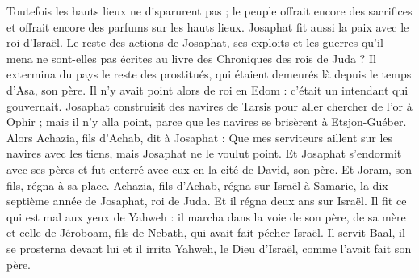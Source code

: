 \begin{multicols}{2}
Toutefois les hauts lieux ne disparurent pas ; le peuple offrait encore des sacrifices et offrait encore des parfums sur les hauts lieux.
Josaphat fit aussi la paix avec le roi d'Israël.
Le reste des actions de Josaphat, ses exploits et les guerres qu'il mena ne sont-elles pas écrites au livre des Chroniques des rois de Juda ?
Il extermina du pays le reste des prostitués, qui étaient demeurés là depuis le temps d'Asa, son père.
Il n'y avait point alors de roi en Edom : c’était un intendant qui gouvernait.
Josaphat construisit des navires de Tarsis pour aller chercher de l'or à Ophir ; mais il n'y alla point, parce que les navires se brisèrent à Etsjon-Guéber.
Alors Achazia, fils d'Achab, dit à Josaphat : Que mes serviteurs aillent sur les navires avec les tiens, mais Josaphat ne le voulut point.
Et Josaphat s’endormit avec ses pères et fut enterré avec eux en la cité de David, son père. Et Joram, son fils, régna à sa place.
Achazia, fils d'Achab, régna sur Israël à Samarie, la dix-septième année de Josaphat, roi de Juda. Et il régna deux ans sur Israël.
Il fit ce qui est mal aux yeux de Yahweh : il marcha dans la voie de son père, de sa mère et celle de Jéroboam, fils de Nebath, qui avait fait pécher Israël.
Il servit Baal, il se prosterna devant lui et il irrita Yahweh, le Dieu d'Israël, comme l’avait fait son père.
\PPE{}
\end{multicols}
